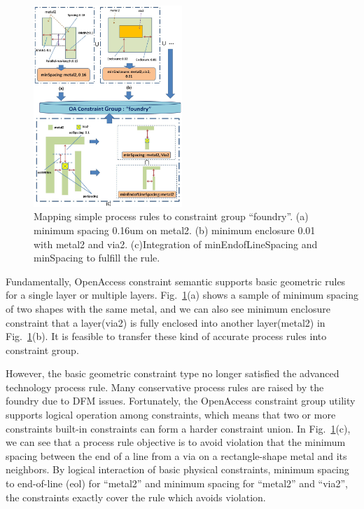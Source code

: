   
  \begin{figure}[t]
    \centering
    \includegraphics[width=0.5\textwidth]{Fig/CG/SimpleRuleCon2.eps}
    \caption{Mapping simple process rules to constraint group ``foundry''. (a) minimum spacing 0.16um on metal2. (b) minimum enclosure 0.01 with metal2 and via2. (c)Integration of minEndofLineSpacing and minSpacing to fulfill the rule.}
    \label{fig:SimruleCon}
  \end{figure}
  
  Fundamentally, OpenAccess constraint semantic supports basic geometric rules for a single layer or multiple layers. Fig.~\ref{fig:SimruleCon}(a) shows a sample of minimum spacing of two shapes with the same metal, and we can also see minimum enclosure constraint that a layer(via2) is fully enclosed into another layer(metal2) in Fig.~\ref{fig:SimruleCon}(b). It is feasible to transfer these kind of accurate process rules into constraint group.

  However, the basic geometric constraint type no longer satisfied the advanced technology process rule. Many conservative process rules are raised by the foundry due to DFM issues. Fortunately, the OpenAccess constraint group utility supports logical operation among constraints, which means that two or more constraints built-in constraints can form a harder constraint union. In Fig.~\ref{fig:SimruleCon}(c), we can see that a process rule objective is to avoid violation that the minimum spacing between the end of a line from a via on a rectangle-shape metal and its neighbors. By logical interaction of basic physical constraints, minimum spacing to end-of-line (eol) for ``metal2'' and minimum spacing for ``metal2'' and ``via2'', the constraints exactly cover the rule which avoids violation.
  
